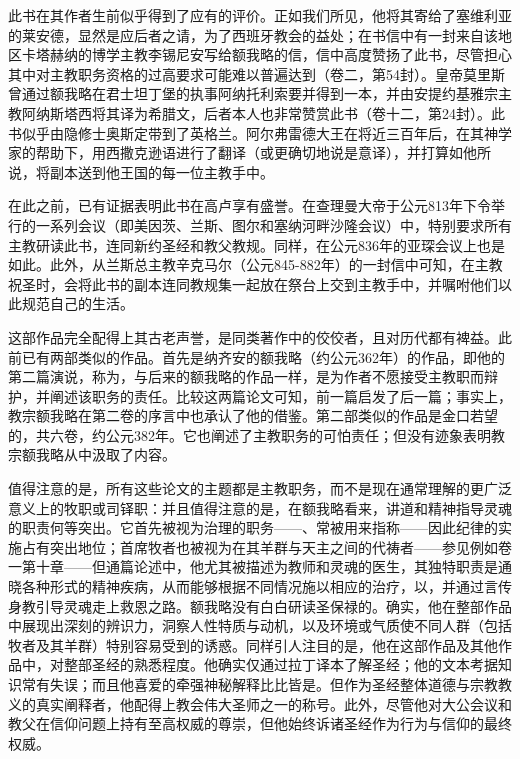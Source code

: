 此书在其作者生前似乎得到了应有的评价。正如我们所见，他将其寄给了塞维利亚的莱安德，显然是应后者之请，为了西班牙教会的益处；在书信中有一封来自该地区卡塔赫纳的博学主教李锡尼安写给额我略的信，信中高度赞扬了此书，尽管担心其中对主教职务资格的过高要求可能难以普遍达到（卷二，第54封）。皇帝莫里斯曾通过额我略在君士坦丁堡的执事阿纳托利索要并得到一本，并由安提约基雅宗主教阿纳斯塔西将其译为希腊文，后者本人也非常赞赏此书（卷十二，第24封）。此书似乎由隐修士奥斯定带到了英格兰。阿尔弗雷德大王在将近三百年后，在其神学家的帮助下，用西撒克逊语进行了翻译（或更确切地说是意译），并打算如他所说，将副本送到他王国的每一位主教手中。\par

在此之前，已有证据表明此书在高卢享有盛誉。在查理曼大帝于公元813年下令举行的一系列会议（即美因茨、兰斯、图尔和塞纳河畔沙隆会议）中，特别要求所有主教研读此书，连同新约圣经和教父教规。同样，在公元836年的亚琛会议上也是如此。此外，从兰斯总主教辛克马尔（公元845-882年）的一封信中可知，在主教祝圣时，会将此书的副本连同教规集一起放在祭台上交到主教手中，并嘱咐他们以此规范自己的生活。\par

这部作品完全配得上其古老声誉，是同类著作中的佼佼者，且对历代都有裨益。此前已有两部类似的作品。首先是纳齐安的额我略（约公元362年）的作品，即他的第二篇演说，称为，与后来的额我略的作品一样，是为作者不愿接受主教职而辩护，并阐述该职务的责任。比较这两篇论文可知，前一篇启发了后一篇；事实上，教宗额我略在第二卷的序言中也承认了他的借鉴。第二部类似的作品是金口若望的，共六卷，约公元382年。它也阐述了主教职务的可怕责任；但没有迹象表明教宗额我略从中汲取了内容。\par

值得注意的是，所有这些论文的主题都是主教职务，而不是现在通常理解的更广泛意义上的牧职或司铎职：并且值得注意的是，在额我略看来，讲道和精神指导灵魂的职责何等突出。它首先被视为治理的职务——、常被用来指称——因此纪律的实施占有突出地位；首席牧者也被视为在其羊群与天主之间的代祷者——参见例如卷一第十章——但通篇论述中，他尤其被描述为教师和灵魂的医生，其独特职责是通晓各种形式的精神疾病，从而能够根据不同情况施以相应的治疗，以，并通过言传身教引导灵魂走上救恩之路。额我略没有白白研读圣保禄的。确实，他在整部作品中展现出深刻的辨识力，洞察人性特质与动机，以及环境或气质使不同人群（包括牧者及其羊群）特别容易受到的诱惑。同样引人注目的是，他在这部作品及其他作品中，对整部圣经的熟悉程度。他确实仅通过拉丁译本了解圣经；他的文本考据知识常有失误；而且他喜爱的牵强神秘解释比比皆是。但作为圣经整体道德与宗教教义的真实阐释者，他配得上教会伟大圣师之一的称号。此外，尽管他对大公会议和教父在信仰问题上持有至高权威的尊崇，但他始终诉诸圣经作为行为与信仰的最终权威。\par

